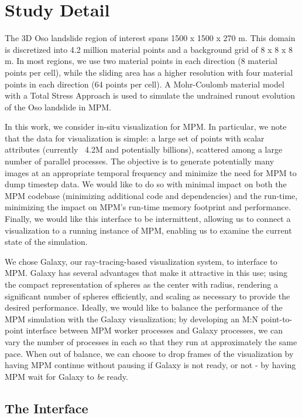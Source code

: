 \documentclass[journal]{IEEEtran}
\begin{document}
\section{Study Detail}
The 3D Oso landslide region of interest spans 1500 x 1500 x 270 m. This domain is discretized into 4.2 million material points and a background grid of 8 x 8 x 8 m. In most regions, we use two material points in each direction (8 material points per cell), while the sliding area has a higher resolution with four material points in each direction (64 points per cell). A Mohr-Coulomb material model with a Total Stress Approach is used to simulate the undrained runout evolution of the Oso landslide in MPM. 

In this work, we consider in-situ visualization for MPM. In particular, we note that the data for visualization is simple: a large set of points with scalar attributes (currently ~4.2M and potentially billions), scattered among a large number of parallel processes.  The objective is to generate potentially many images at an appropriate temporal frequency and minimize the need for MPM to dump timestep data.  We would like to do so with minimal impact on both the MPM codebase (minimizing additional code and dependencies) and the run-time, minimizing the impact on MPM's run-time memory footprint and performance.  Finally, we would like this interface to be intermittent, allowing us to connect a visualization to a running instance of MPM, enabling us to examine the current state of the simulation.

We chose Galaxy, our ray-tracing-based visualization system, to interface to MPM.  Galaxy has several advantages that make it attractive in this use; using the compact representation of spheres as the center with radius, rendering a significant number of spheres efficiently, and scaling as necessary to provide the desired performance.  Ideally, we would like to balance the performance of the MPM simulation with the Galaxy visualization; by developing an M:N point-to-point interface between MPM worker processes and Galaxy processes, we can vary the number of processes in each so that they run at approximately the same pace.  When out of balance, we can choose to drop frames of the visualization by having MPM continue without pausing if Galaxy is not ready, or not - by having MPM wait for Galaxy to \textit{be} ready.

\subsection{The Interface}
\end{document}
